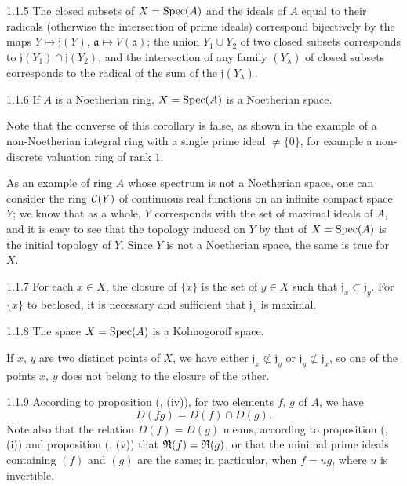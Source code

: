 \begin{env}[Corollary]{1.1.5}
\label{cor-1.1.1.5}
The closed subsets of $X=\operatorname{Spec}(A)$ and the ideals of $A$ equal to their radicals (otherwise the
intersection of prime ideals) correspond bijectively by the  maps $Y\mapsto\mathfrak{j}(Y)$,
$\mathfrak{a}\mapsto V(\mathfrak{a})$; the union $Y_1\cup Y_2$ of two closed subsets corresponds to
$\mathfrak{j}(Y_1)\cap\mathfrak{j}(Y_2)$, and the intersection of any family $(Y_\lambda)$ of closed subsets
corresponds to the radical of the sum of the $\mathfrak{j}(Y_\lambda)$.
\end{env}

\begin{env}[Corollary]{1.1.6}
\label{cor-1.1.1.6}
If $A$ is a Noetherian ring, $X=\operatorname{Spec}(A)$ is a Noetherian space.
\end{env}
Note that the converse of this corollary is false, as shown
in the example of a non-Noetherian integral ring with a single prime ideal $\neq\{0\}$, for
example a non-discrete valuation ring of rank $1$.

As an example of ring $A$ whose spectrum is not a Noetherian space, one
can consider the ring $\mathcal{C}(Y)$ of continuous real functions on an infinite compact space
$Y$; we know that as a whole, $Y$ corresponds with the set of maximal ideals
of $A$, and it is easy to see that the topology induced on $Y$ by that of $X=\operatorname{Spec}(A)$
is the initial topology of $Y$. Since $Y$ is not a Noetherian space, the same is true for $X$.

\begin{env}[Corollary]{1.1.7}
\label{cor-1.1.1.7}
For each $x\in X$, the closure of $\{x\}$ is the set of $y\in X$ such that $\mathfrak{j}_x\subset\mathfrak{j}_y$.
For $\{x\}$ to beclosed, it is necessary and sufficient that $\mathfrak{j}_x$ is maximal.
\end{env}

\begin{env}[Corollary]{1.1.8}
\label{cor-1.1.1.8}
The space $X=\operatorname{Spec}(A)$ is a Kolmogoroff space.
\end{env}

If $x$, $y$ are two distinct points of $X$, we have either $\mathfrak{j}_x\not\subset\mathfrak{j}_y$ or
$\mathfrak{j}_y\not\subset\mathfrak{j}_x$, so one of the points $x$, $y$ does not belong to the closure of the other.

\begin{env}{1.1.9}
\label{env-1.1.1.9}
According to proposition (, (iv)), for two elements $f$, $g$ of $A$, we have
\[
  D(fg)=D(f)\cap D(g).\tag{1.1.9.1}
\]
Note also that the relation $D(f)=D(g)$ means, according to proposition (, (i))
and proposition (, (v)) that $\mathfrak{R}(f)=\mathfrak{R}(g)$, or that the minimal prime ideals
containing $(f)$ and $(g)$ are the same; in particular, when $f=ug$, where $u$ is invertible.
\end{env}

